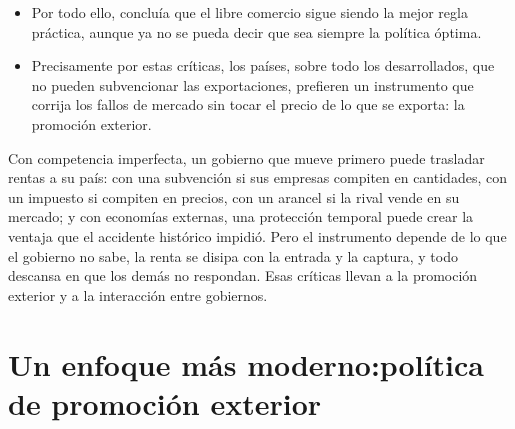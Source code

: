 \documentclass[11pt]{article}
\begin{document}
\begin{itemize}
\begin{itemize}
  \item \emph{Represalias y reglas}: es una política de empobrecimiento del vecino, que invita a responder y suele acabar en un dilema del prisionero (\ref{sec:gobiernos}). Por eso las reglas multilaterales la limitan: el Acuerdo sobre Subvenciones y Medidas Compensatorias de la OMC \emph{prohíbe} las subvenciones supeditadas a la exportación o al uso de productos nacionales (art.~3) y permite recurrir contra las demás cuando causan efectos desfavorables, con derechos compensatorios o en el sistema de solución de diferencias\nocite{OMC1994SMC} .\footnote{En la disputa de los grandes aviones, la OMC dio la razón a cada parte en lo esencial: la Unión Europea había dado a \emph{Airbus} préstamos de lanzamiento en condiciones mejores que las de mercado (DS316), y Estados Unidos había dado a \emph{Boeing} ventajas fiscales federales y del estado de Washington y fondos de investigación de la NASA y del Departamento de Defensa (DS353)\nocite{OMC2019DS316,OMC2020DS353}.}
  \end{itemize}
\item Por todo ello, \textcite{Krugman1987Passe} concluía que el libre comercio sigue siendo la mejor regla práctica, aunque ya no se pueda decir que sea siempre la política óptima.
\item Precisamente por estas críticas, los países, sobre todo los desarrollados, que no pueden subvencionar las exportaciones, prefieren un instrumento que corrija los fallos de mercado sin tocar el precio de lo que se exporta: la promoción exterior.
\end{itemize}

\begin{ideaclave}
Con competencia imperfecta, un gobierno que mueve primero puede trasladar rentas a su país: con una subvención si sus empresas compiten en cantidades, con un impuesto si compiten en precios, con un arancel si la rival vende en su mercado; y con economías externas, una protección temporal puede crear la ventaja que el accidente histórico impidió. Pero el instrumento depende de lo que el gobierno no sabe, la renta se disipa con la entrada y la captura, y todo descansa en que los demás no respondan. Esas críticas llevan a la promoción exterior y a la interacción entre gobiernos.
\end{ideaclave}

\section{Un enfoque más moderno:\newline política de promoción exterior}\label{sec:promocion}
\end{document}
